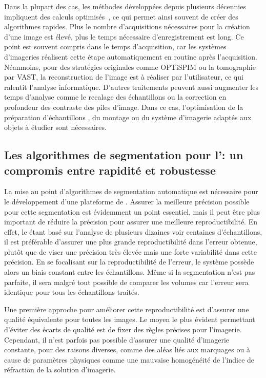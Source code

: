 \documentclass[\main/main.tex]{subfiles}
\begin{document}
%
Dans la plupart des cas, les méthodes développées depuis plusieurs décennies impliquent des calculs optimisés~\cite{vandroogenbroeck_1996,perreault_2007,trieu_2007}, ce qui permet ainsi souvent de créer des algorithmes rapides.
%
Plus le nombre d'acquisitions nécessaires pour la création d'une image est élevé, plus le temps nécessaire d'enregistrement est long.
%
Ce point est souvent compris dans le temps d'acquisition, car les systèmes d'imageries réalisent cette étape automatiquement en routine après l'acquisition.
%
Néanmoins, pour des stratégies  originales comme OPTiSPIM ou la tomographie par VAST, la reconstruction de l'image est à réaliser par l'utilisateur, ce qui ralentit l'analyse informatique.
%
D'autres traitements peuvent aussi augmenter les temps d'analyse comme le recalage des échantillons ou la correction en profondeur des contraste des piles d'image.
%
Dans ce cas, l'optimisation de la préparation d'échantillons , du montage ou du système d'imagerie adaptés aux objets à étudier sont nécessaires.
%

    \subsection{Les algorithmes de segmentation pour l'\hca{}: un compromis entre rapidité et robustesse}

%
La mise au point d'algorithmes de segmentation automatique est nécessaire pour le développement d'une plateforme de \hcs{}.
%
Assurer la meilleure précision possible pour cette segmentation est évidemment un point essentiel, mais il peut être plus important de réduire la précision pour assurer une meilleure reproductibilité.
%
En effet, le \hcs{} étant basé sur l'analyse de plusieurs dizaines voir centaines d'échantillons,
il est préférable d'assurer une plus grande reproductibilité dans l'erreur obtenue, plutôt que de viser une précision très élevée mais une forte variabilité dans cette précision.
%
En se focalisant sur la reproductibilité de l'erreur, le système possède alors un biais constant entre les échantillons. Même si la segmentation n'est pas parfaite, il sera malgré tout possible de comparer les volumes car l'erreur sera identique pour tous les échantillons traités.

%
Une première approche pour améliorer cette reproductibilité est d'assurer une qualité équivalente pour toutes les images.
%
Le moyen le plus évident permettant d'éviter des écarts de qualité est de fixer des règles précises pour l'imagerie.
%
Cependant, il n'est parfois pas possible d'assurer une qualité d'imagerie constante, pour des raisons diverses, comme des aléas liés aux marquages \ihc{} ou à cause de paramètres physiques comme une mauvaise homogénéité de l'indice de réfraction de la solution d'imagerie.
\end{document}
